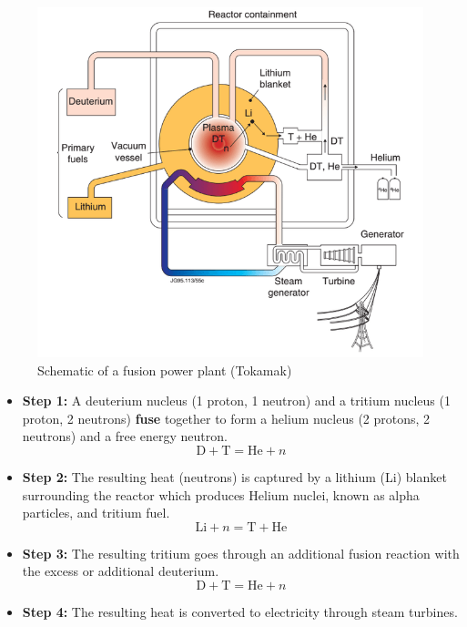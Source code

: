 \documentclass[12pt,lot, lof]{puthesis}
\begin{document}
\begin{figure}
\centering
\includegraphics[width= 1\linewidth]{Fusion_power_plant.png}
\caption{Schematic of a fusion power plant (Tokamak)}
\label{Fusion_power_plan}
\end{figure}

\begin{itemize}
\item \textbf{Step 1:} A deuterium nucleus (1 proton, 1 neutron) and a tritium nucleus (1 proton, 2 neutrons) \textbf{fuse} together to form a helium nucleus (2 protons, 2 neutrons) and a free energy neutron. 
\begin{equation}
\text{D} + \text{T} = \text{He} + n
\label{reac1}
\end{equation}
\item \textbf{Step 2:} The resulting heat (neutrons) is captured by a lithium (Li) blanket surrounding the reactor which produces Helium nuclei, known as alpha particles, and tritium fuel. 
\begin{equation}
\text{Li} + n = \text{T} + \text{He}
\label{reac2}
\end{equation}
\item \textbf{Step 3:} The resulting tritium goes through an additional fusion reaction with the excess or additional deuterium.
\begin{equation}
\text{D} + \text{T} = \text{He} +n
\label{reac3}
\end{equation}
\item \textbf{Step 4:} The resulting heat is converted to electricity through steam turbines.
\end{itemize}
\end{document}
